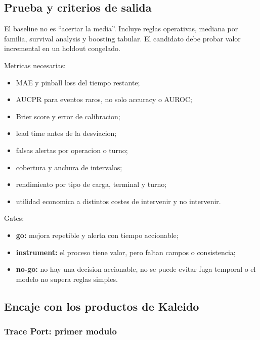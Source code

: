 \documentclass[
  spanish,
  10pt,
  a4paper,
]{article}
\providecommand{\tightlist}{%
  \setlength{\itemsep}{0pt}\setlength{\parskip}{0pt}}
\begin{document}
\subsection{Prueba y criterios de
salida}\label{prueba-y-criterios-de-salida}

El baseline no es ``acertar la media''. Incluye reglas operativas,
mediana por familia, survival analysis y boosting tabular. El candidato
debe probar valor incremental en un holdout congelado.

Metricas necesarias:

\begin{itemize}
\tightlist
\item
  MAE y pinball loss del tiempo restante;
\item
  AUCPR para eventos raros, no solo accuracy o AUROC;
\item
  Brier score y error de calibracion;
\item
  lead time antes de la desviacion;
\item
  falsas alertas por operacion o turno;
\item
  cobertura y anchura de intervalos;
\item
  rendimiento por tipo de carga, terminal y turno;
\item
  utilidad economica a distintos costes de intervenir y no intervenir.
\end{itemize}

Gates:

\begin{itemize}
\tightlist
\item
  \textbf{go:} mejora repetible y alerta con tiempo accionable;
\item
  \textbf{instrument:} el proceso tiene valor, pero faltan campos o
  consistencia;
\item
  \textbf{no-go:} no hay una decision accionable, no se puede evitar
  fuga temporal o el modelo no supera reglas simples.
\end{itemize}

\subsection{Encaje con los productos de
Kaleido}\label{encaje-con-los-productos-de-kaleido}

\subsubsection{Trace Port: primer
modulo}\label{trace-port-primer-modulo}
\end{document}

